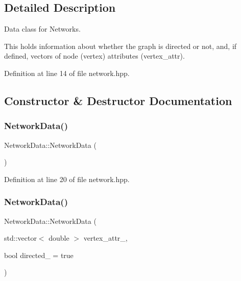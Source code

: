\subsection{Detailed Description}
Data class for Networks. 

This holds information about whether the graph is directed or not, and, if defined, vectors of node (vertex) attributes ({\ttfamily vertex\+\_\+attr}). 

Definition at line 14 of file network.\+hpp.



\subsection{Constructor \& Destructor Documentation}
\mbox{\label{class_network_data_af62a7dde71c52bc49bc1e0ddc27b4724}} 
\subsubsection{\texorpdfstring{Network\+Data()}{NetworkData()}\hspace{0.1cm}{\footnotesize\ttfamily [1/3]}}
{\footnotesize\ttfamily Network\+Data\+::\+Network\+Data (\begin{DoxyParamCaption}{ }\end{DoxyParamCaption})\hspace{0.3cm}{\ttfamily [inline]}}



Definition at line 20 of file network.\+hpp.

\mbox{\label{class_network_data_a431d2c3a6cf9f61437643b767821e4a5}} 
\subsubsection{\texorpdfstring{Network\+Data()}{NetworkData()}\hspace{0.1cm}{\footnotesize\ttfamily [2/3]}}
{\footnotesize\ttfamily Network\+Data\+::\+Network\+Data (\begin{DoxyParamCaption}\item[{std\+::vector$<$ double $>$}]{vertex\+\_\+attr\+\_\+,  }\item[{bool}]{directed\+\_\+ = {\ttfamily true} }\end{DoxyParamCaption})\hspace{0.3cm}{\ttfamily [inline]}}



